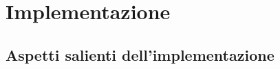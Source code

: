 \section{Implementazione}\label{implementazione}

\subsection{Aspetti salienti
dell'implementazione}\label{aspetti-salienti-dellimplementazione}
